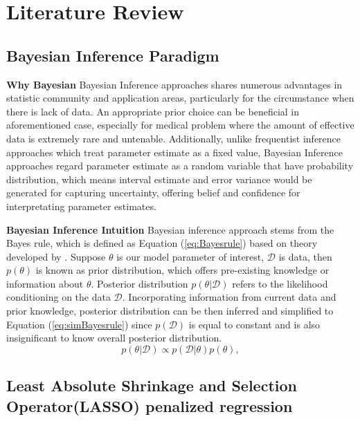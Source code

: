 \chapter{Literature Review}
\label{Chapter2}

\section{Bayesian Inference Paradigm}
\label{bayeisanP}
\textbf{Why Bayesian}
Bayesian Inference approaches shares numerous advantages in statistic community and application areas, particularly for the circumstance when there is lack of data. An appropriate prior choice can be beneficial in aforementioned case, especially for medical problem where the amount of effective data is extremely rare and untenable. Additionally, unlike frequentist inference approaches which treat parameter estimate as a fixed value, Bayesian Inference approaches regard parameter estimate as a random variable that have probability distribution, which means interval estimate and error variance would be generated for capturing uncertainty, offering  belief and confidence for interpretating parameter estimates.

\textbf{Bayesian Inference Intuition}
Bayesian inference approach stems from the Bayes rule, which is defined as Equation (\ref{eq:Bayesrule}) based on theory developed by \cite{Beech1959}. Suppose $\theta$ is our model parameter of interest, $\mathcal{D}$ is data, then $p(\theta)$ is known as prior distribution, which offers pre-existing knowledge or information about $\theta$. Posterior distribution $p(\theta|\mathcal{D})$ refers to the likelihood conditioning on the data $\mathcal{D}$.
Incorporating information from current data and prior knowledge, posterior distribution can be then inferred and simplified to Equation (\ref{eq:simBayesrule}) since $p(\mathcal{D})$ is equal to constant and is also insignificant to know overall posterior distribution.
\begin{equation}
	p(\theta|\mathcal{D}) \propto p(\mathcal{D}|\theta)p(\theta),
	\label{eq:simBayesrule}
\end{equation}




\section{Least Absolute Shrinkage and Selection Operator(LASSO) penalized regression}

